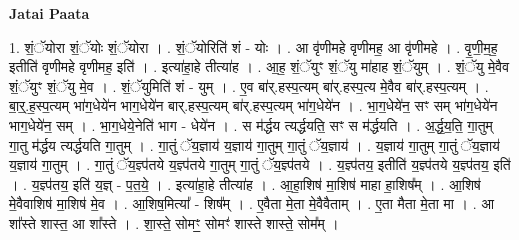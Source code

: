 \documentclass[17pt]{extarticle}
\begin{document}
\textbf{Jatai Paata} \newline

1. शं॒ॅयोरा शं॒ॅयोः शं॒ॅयोरा । . शं॒ॅयोरिति॑ शं - योः । . आ वृ॑णीमहे वृणीमह॒ आ वृ॑णीमहे । . वृ॒णी॒म॒ह॒ इतीति॑ वृणीमहे वृणीमह॒ इति॑ । . इत्या॑हा॒हे तीत्या॑ह । . आ॒ह॒ शं॒ॅयुꣳ शं॒ॅयु मा॑हाह शं॒ॅयुम् । . शं॒ॅयु मे॒वैव शं॒ॅयुꣳ शं॒ॅयु मे॒व । . शं॒ॅयुमिति॑ शं - युम् । . ए॒व बा॑र्.हस्प॒त्यम् बा॑र्.हस्प॒त्य मे॒वैव बा॑र्.हस्प॒त्यम् । . बा॒र्॒.ह॒स्प॒त्यम् भा॑ग॒धेये॑न भाग॒धेये॑न बार्.हस्प॒त्यम् बा॑र्.हस्प॒त्यम् भा॑ग॒धेये॑न । . भा॒ग॒धेये॑न॒ सꣳ सम् भा॑ग॒धेये॑न भाग॒धेये॑न॒ सम् । . भा॒ग॒धेये॒नेति॑ भाग - धेये॑न । . स म॑र्द्धय त्यर्द्धयति॒ सꣳ स म॑र्द्धयति । . अ॒र्द्ध॒य॒ति॒ गा॒तुम् गा॒तु म॑र्द्धय त्यर्द्धयति गा॒तुम् । . गा॒तुं ॅय॒ज्ञाय॑ य॒ज्ञाय॑ गा॒तुम् गा॒तुं ॅय॒ज्ञाय॑ । . य॒ज्ञाय॑ गा॒तुम् गा॒तुं ॅय॒ज्ञाय॑ य॒ज्ञाय॑ गा॒तुम् । . गा॒तुं ॅय॒ज्ञ्प॑तये य॒ज्ञ्प॑तये गा॒तुम् गा॒तुं ॅय॒ज्ञ्प॑तये । . य॒ज्ञ्प॑तय॒ इतीति॑ य॒ज्ञ्प॑तये य॒ज्ञ्प॑तय॒ इति॑ । . य॒ज्ञ्प॑तय॒ इति॑ य॒ज्ञ् - प॒त॒ये॒ । . इत्या॑हा॒हे तीत्या॑ह । . आ॒हा॒शिष॑ मा॒शिष॑ माहा हा॒शिष᳚म् । . आ॒शिष॑ मे॒वैवाशिष॑ मा॒शिष॑ मे॒व । . आ॒शिष॒मित्या᳚ - शिष᳚म् । . ए॒वैता मे॒ता मे॒वैवैताम् । . ए॒ता मैता मे॒ता मा । . आ शा᳚स्ते शास्त॒ आ शा᳚स्ते । . शा॒स्ते॒ सोमꣳ॒॒ सोमꣳ॑ शास्ते शास्ते॒ सोम᳚म् । \newline
\end{document}

